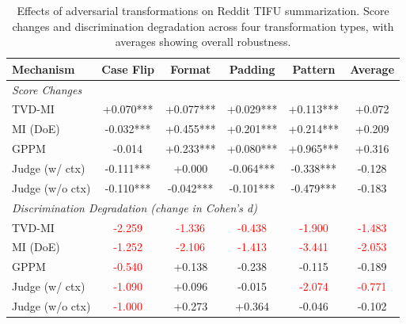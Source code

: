
\begin{table}[h]
\centering
\caption{Effects of adversarial transformations on Reddit TIFU summarization. Score changes and discrimination
degradation across four transformation types, with averages showing overall robustness.}
\label{tab:tampering_comprehensive}
\begin{tabular}{lccccc}
\toprule
\textbf{Mechanism} & \textbf{Case Flip} & \textbf{Format} & \textbf{Padding} & \textbf{Pattern} & \textbf{Average} \\
\midrule
\multicolumn{6}{l}{\textit{Score Changes}} \\
TVD-MI & +0.070*** & +0.077*** & +0.029*** & +0.113*** & +0.072 \\
MI (DoE) & -0.032*** & +0.455*** & +0.201*** & +0.214*** & +0.209 \\
GPPM & -0.014 & +0.233*** & +0.080*** & +0.965*** & +0.316 \\
Judge (w/ ctx) & -0.111*** & +0.000 & -0.064*** & -0.338*** & -0.128 \\
Judge (w/o ctx) & -0.110*** & -0.042*** & -0.101*** & -0.479*** & -0.183 \\
\midrule
\multicolumn{6}{l}{\textit{Discrimination Degradation (change in Cohen's d)}} \\
TVD-MI & \textcolor{red}{-2.259} & \textcolor{red}{-1.336} & \textcolor{red}{-0.438} & \textcolor{red}{-1.900} & \textcolor{red}{-1.483} \\
MI (DoE) & \textcolor{red}{-1.252} & \textcolor{red}{-2.106} & \textcolor{red}{-1.413} & \textcolor{red}{-3.441} & \textcolor{red}{-2.053} \\
GPPM & \textcolor{red}{-0.540} & +0.138 & -0.238 & -0.115 & -0.189 \\
Judge (w/ ctx) & \textcolor{red}{-1.090} & +0.096 & -0.015 & \textcolor{red}{-2.074} & \textcolor{red}{-0.771} \\
Judge (w/o ctx) & \textcolor{red}{-1.000} & +0.273 & +0.364 & -0.046 & -0.102 \\
\bottomrule
\end{tabular}
\end{table}